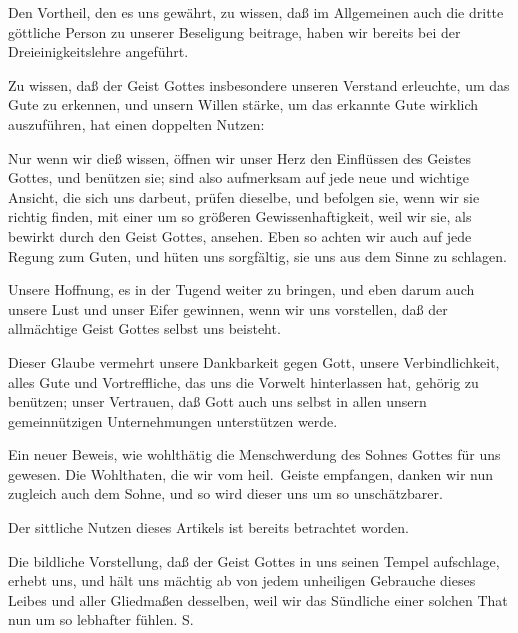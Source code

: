 Den Vortheil, den es uns gewährt, zu wissen, daß im Allgemeinen auch die dritte göttliche Person zu unserer Beseligung beitrage, haben wir bereits bei der Dreieinigkeitslehre angeführt.~
\begin{aufza}
\item Zu wissen, daß der Geist Gottes insbesondere unseren Verstand erleuchte, um das Gute zu erkennen, und unsern Willen stärke, um das erkannte Gute wirklich auszuführen, hat einen doppelten Nutzen:
\begin{aufzb}
\item Nur wenn wir dieß wissen, öffnen wir unser Herz den Einflüssen des Geistes Gottes, und benützen sie; sind also aufmerksam auf jede neue und wichtige Ansicht, die sich uns darbeut, prüfen dieselbe, und befolgen sie, wenn wir sie richtig finden, mit einer um so größeren Gewissenhaftigkeit, weil wir sie, als bewirkt durch den Geist Gottes, ansehen. Eben so achten wir auch auf jede Regung zum Guten, und hüten uns sorgfältig, sie uns aus dem Sinne zu schlagen.
\item Unsere Hoffnung, es in der Tugend weiter zu bringen, und eben darum auch unsere Lust und unser Eifer gewinnen, wenn wir uns vorstellen, daß der allmächtige Geist Gottes selbst uns beisteht.
\end{aufzb}
\item Dieser Glaube vermehrt unsere Dankbarkeit gegen Gott, unsere Verbindlichkeit, alles Gute und Vortreffliche, das uns die Vorwelt hinterlassen hat, gehörig zu benützen; unser Vertrauen, daß Gott auch uns selbst in allen unsern gemeinnützigen Unternehmungen unterstützen werde.
\item Ein neuer Beweis, wie wohlthätig die Menschwerdung des Sohnes Gottes für uns gewesen. Die Wohlthaten, die wir vom heil.\ Geiste empfangen, danken wir nun zugleich auch dem Sohne, und so wird dieser uns um so unschätzbarer.
\item Der sittliche Nutzen dieses Artikels ist bereits betrachtet worden.
\item Die bildliche Vorstellung, daß der Geist Gottes in uns seinen Tempel aufschlage, erhebt uns, und hält uns mächtig ab von jedem unheiligen Gebrauche dieses Leibes und aller Gliedmaßen desselben, weil wir das Sündliche einer solchen That nun um so lebhafter fühlen. S.\ 
\end{aufza}

